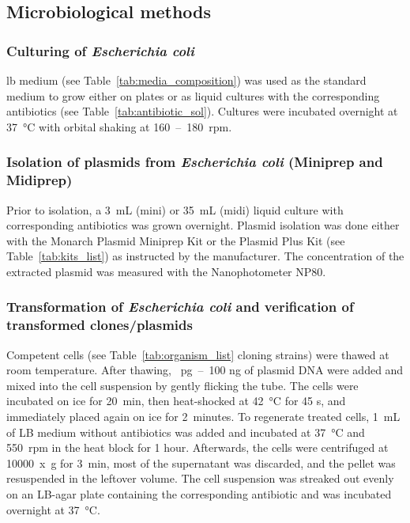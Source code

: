 \subsection{Microbiological methods}
\subsubsection{Culturing of \textit{Escherichia coli}} \label{txt:Culture_Eco}
\Gls{lb} medium (see Table~\ref{tab:media_composition}) was used as the standard medium to grow  either on plates or as liquid cultures with the corresponding antibiotics (see Table~\ref{tab:antibiotic_sol}). Cultures were incubated overnight at 37~°C with orbital shaking at 160~--~180~rpm. 
\subsubsection{Isolation of plasmids from \textit{Escherichia coli} (Miniprep and Midiprep)} \label{txt:Plasmidprep}
Prior to isolation, a 3~mL (mini) or 35~mL (midi) liquid culture with corresponding antibiotics was grown overnight. Plasmid isolation was done either with the Monarch Plasmid Miniprep Kit or the Plasmid Plus Kit (see Table~\ref{tab:kits_list}) as instructed by the manufacturer. The concentration of the extracted plasmid was measured with the Nanophotometer NP80.
\subsubsection{Transformation of \textit{Escherichia coli} and verification of transformed clones/plasmids} \label{txt:Trafo_and_veri}
Competent cells (see Table~\ref{tab:organism_list} cloning strains) were thawed at room temperature. After thawing, ~pg~--~100 ng of plasmid DNA were added and mixed into the cell suspension by gently flicking the tube. The cells were incubated on ice for 20~min, then heat-shocked at 42~°C for 45 s, and immediately placed again on ice for 2~minutes. To regenerate treated cells,  1~mL of LB medium without antibiotics was added and incubated at 37~°C and 550~rpm in the heat block for 1 hour. Afterwards, the cells were centrifuged at 10000~x~g for 3~min, most of the supernatant was discarded, and the pellet was resuspended in the leftover volume. The cell suspension was streaked out evenly on an LB-agar plate containing the corresponding antibiotic and was incubated overnight at 37~°C.  

